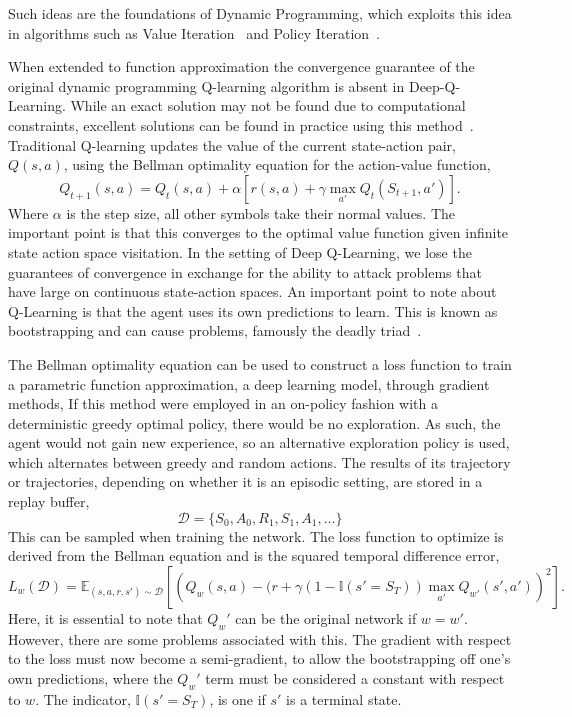 Such ideas are the foundations of Dynamic Programming, which exploits this idea in algorithms such as Value Iteration~\cite{bellamn1957mdp} and Policy Iteration~\cite{howard1960dynamic}.

When extended to function approximation the convergence guarantee of the original dynamic programming Q-learning algorithm is absent in Deep-Q-Learning. While an exact solution may not be found due to computational constraints, excellent solutions can be found in practice using this method~\cite{mnih2013playing}. Traditional Q-learning updates the value of the current state-action pair, $Q(s, a)$, using the Bellman optimality equation for the action-value function,
\begin{equation}
	Q_{t+1}(s, a) = Q_t(s,a) + \alpha \left[ r(s, a) + \gamma \max_{a'} Q_t(S_{t+1}, a') \right].
\end{equation}
Where $\alpha$ is the step size, all other symbols take their normal values. The important point is that this converges to the optimal value function given infinite state action space visitation. In the setting of Deep Q-Learning, we lose the guarantees of convergence in exchange for the ability to attack problems that have large on continuous state-action spaces. An important point to note about Q-Learning is that the agent uses its own predictions to learn. This is known as bootstrapping and can cause problems, famously the deadly triad~\cite{van2018deep,sutton2018reinforcement}.

The Bellman optimality equation can be used to construct a loss function to train a parametric function approximation, a deep learning model, through gradient methods, If this method were employed in an on-policy fashion with a deterministic greedy optimal policy, there would be no exploration. As such, the agent would not gain new experience, so an alternative exploration policy is used, which alternates between greedy and random actions. The results of its trajectory or trajectories, depending on whether it is an episodic setting, are stored in a replay buffer,
\begin{equation}
	\mathcal{D} = \{S_0, A_0, R_1, S_1, A_1, \ldots \}
\end{equation}
This can be sampled when training the network. The loss function to optimize is derived from the Bellman equation and is the squared temporal difference error\cite{sutton2018reinforcement},
\begin{equation}
	L_{w}(\mathcal{D}) = \mathbb{E}_{(s,a,r,s') \sim \mathcal{D}}\left[\left(Q_w(s,a) -(r + \gamma(1-\mathbb{I}(s'= S_{T}))\max_{a'}Q_{w'}(s', a')\right)^2\right].
\end{equation}
Here, it is essential to note that $Q_w'$ can be the original network if $w = w'$. However, there are some problems associated with this. The gradient with respect to the loss must now become a semi-gradient, to allow the bootstrapping off one's own predictions, where the $Q_w'$ term must be considered a constant with respect to $w$. The indicator, $\mathbb{I}(s' = S_T)$,  is one if $s'$ is a terminal state.

